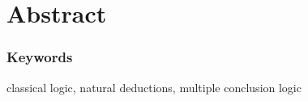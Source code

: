 % 
% 
% 
    \cleardoublepage
%     
\chapter*{Abstract}
%  
    
    \strut
    \vfill

    \subsection*{Keywords}
     classical logic,
     natural deductions,
     multiple conclusion logic
